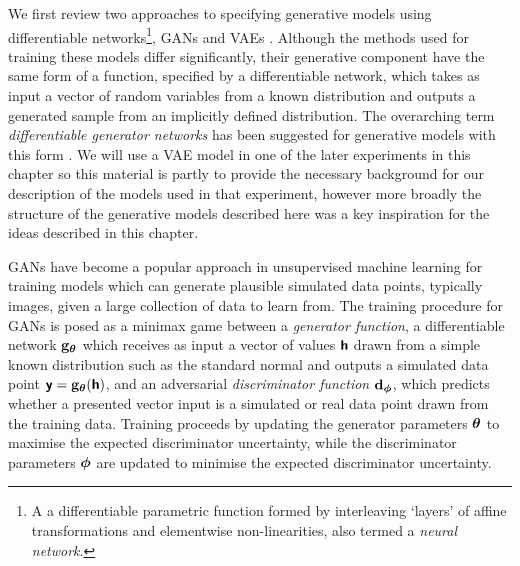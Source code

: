 We first review two approaches to specifying generative models using differentiable networks\footnote{A a differentiable parametric function formed by interleaving `layers' of affine transformations and elementwise non-linearities, also termed a \emph{neural network}.}, \acfp{GAN} \citep{goodfellow2014generative} and \acfp{VAE} \citep{kingma2013auto,rezende2014stochastic}. Although the methods used for training these models differ significantly, their generative component have the same form of a function, specified by a differentiable network, which takes as input a vector of random variables from a known distribution and outputs a generated sample from an implicitly defined distribution. The overarching term \emph{differentiable generator networks} has been suggested for generative models with this form \citep{goodfellow2016deep}. We will use a \ac{VAE} model in one of the later experiments in this chapter so this material is partly to provide the necessary background for our description of the models used in that experiment, however more broadly the structure of the generative models described here was a key inspiration for the ideas described in this chapter.

\acp{GAN} \citep{goodfellow2014generative} have become a popular approach in unsupervised machine learning for training models which can generate plausible simulated data points, typically images, given a large collection of data to learn from. The training procedure for \acp{GAN} is posed as a minimax game between a \emph{generator function}, a differentiable network ${\mathbf{g}}_{\boldsymbol{\theta}}$ which receives as input a vector of values $\boldsymbol{\mathsf{h}}$ drawn from a simple known distribution such as the standard normal and outputs a simulated data point $\boldsymbol{\mathsf{y}} = {\mathbf{g}}_{\boldsymbol{\theta}}(\boldsymbol{\mathsf{h}})$, and an adversarial \emph{discriminator function} ${\mathbf{d}}_{\boldsymbol{\phi}}$, which predicts whether a presented vector input is a simulated or real data point drawn from the training data.  Training proceeds by updating the generator parameters $\boldsymbol{\theta}$ to maximise the expected discriminator uncertainty, while the discriminator parameters $\boldsymbol{\phi}$ are updated to minimise the expected discriminator uncertainty.

